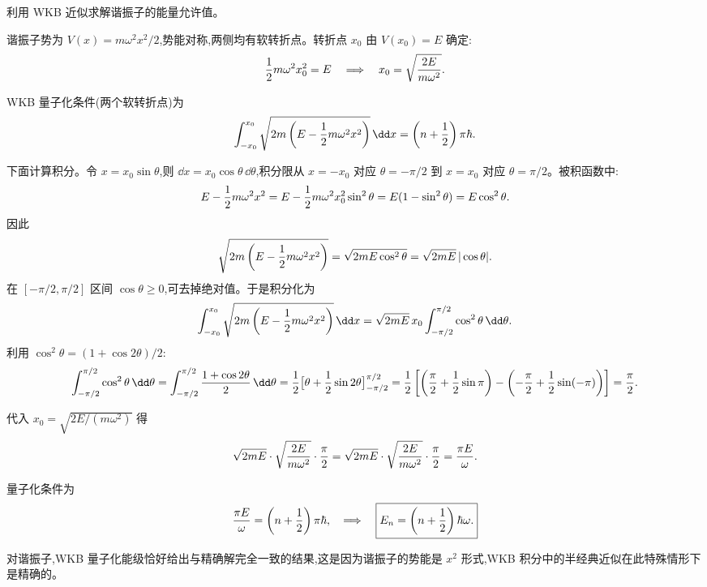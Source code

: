 \begin{question}
利用 WKB 近似求解谐振子的能量允许值。
\end{question}
\begin{solution}
谐振子势为 $V(x)=m\omega^2x^2/2$,势能对称,两侧均有软转折点。转折点 $x_0$ 由 $V(x_0)=E$ 确定:
\[
{1\over2}m\omega^2x_0^2=E\quad\Longrightarrow\quad
x_0=\sqrt{2E\over m\omega^2}.
\]

WKB 量子化条件(两个软转折点)为
\[
\int_{-x_0}^{x_0}\sqrt{2m\left(E-{1\over2}m\omega^2x^2\right)}\,\dd x
=\left(n+{1\over2}\right)\pi\hbar.
\]

下面计算积分。令 $x=x_0\sin\theta$,则 $\dd x=x_0\cos\theta\,\dd\theta$,积分限从 $x=-x_0$ 对应 $\theta=-\pi/2$ 到 $x=x_0$ 对应 $\theta=\pi/2$。被积函数中:
\[
E-{1\over2}m\omega^2x^2
=E-{1\over2}m\omega^2x_0^2\sin^2\theta
=E(1-\sin^2\theta)=E\cos^2\theta.
\]
因此
\[
\sqrt{2m\left(E-{1\over2}m\omega^2x^2\right)}
=\sqrt{2mE\cos^2\theta}=\sqrt{2mE}\,|\cos\theta|.
\]
在 $[-\pi/2,\pi/2]$ 区间 $\cos\theta\ge0$,可去掉绝对值。于是积分化为
\[
\int_{-x_0}^{x_0}\sqrt{2m\left(E-{1\over2}m\omega^2x^2\right)}\,\dd x
=\sqrt{2mE}\,x_0\int_{-\pi/2}^{\pi/2}\cos^2\theta\,\dd\theta.
\]
利用 $\cos^2\theta=(1+\cos2\theta)/2$:
\[
\int_{-\pi/2}^{\pi/2}\cos^2\theta\,\dd\theta
=\int_{-\pi/2}^{\pi/2}{1+\cos2\theta\over2}\,\dd\theta
={1\over2}\bigl[\theta+{1\over2}\sin2\theta\bigr]_{-\pi/2}^{\pi/2}
={1\over2}\left[\left({\pi\over2}+{1\over2}\sin\pi\right)
-\left(-{\pi\over2}+{1\over2}\sin(-\pi)\right)\right]
={\pi\over2}.
\]

代入 $x_0=\sqrt{2E/(m\omega^2)}$ 得
\[
\sqrt{2mE}\cdot\sqrt{2E\over m\omega^2}\cdot{\pi\over2}
=\sqrt{2mE}\cdot\sqrt{2E\over m\omega^2}\cdot{\pi\over2}
={\pi E\over\omega}.
\]

量子化条件为
\[
{\pi E\over\omega}=\left(n+{1\over2}\right)\pi\hbar,
\quad\Longrightarrow\quad
\boxed{E_n=\left(n+{1\over2}\right)\hbar\omega.}
\]

对谐振子,WKB 量子化能级恰好给出与精确解完全一致的结果,这是因为谐振子的势能是 $x^2$ 形式,WKB 积分中的半经典近似在此特殊情形下是精确的。
\end{solution}

